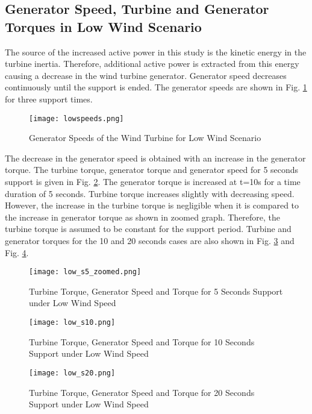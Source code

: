 \subsection{Generator Speed, Turbine and Generator Torques in Low Wind Scenario}
The source of the increased active power in this study is the kinetic energy in the turbine inertia. Therefore, additional active power is extracted from this energy causing a decrease in the wind turbine generator. Generator speed decreases continuously until the support is ended. The generator speeds are shown in Fig. \ref{low_speeds} for three support times.\par
\begin{figure}[h!]
	\centering
	\texttt{[image: lowspeeds.png]}
	\caption{Generator Speeds of the Wind Turbine for Low Wind Scenario}
	\label{low_speeds}
\end{figure}
The decrease in the generator speed is obtained with an increase in the generator torque. The turbine torque, generator torque and generator speed for 5 seconds support is given in Fig. \ref{low_torques}. The generator torque is increased at t=10s for a time duration of 5 seconds. Turbine torque increases slightly with decreasing speed. However, the increase in the turbine torque is negligible when it is compared to the increase in generator torque as shown in zoomed graph. Therefore, the turbine torque is assumed to be constant for the support period. Turbine and generator torques for the 10 and 20 seconds cases are also shown in Fig. \ref{low_torques2} and Fig. \ref{low_torques3}. 
\begin{figure}[h!]
	\centering
	\texttt{[image: low\_s5\_zoomed.png]}
	\caption{Turbine Torque, Generator Speed and Torque for 5 Seconds Support under Low Wind Speed}
	\label{low_torques}
\end{figure}

\begin{figure}[h!]
	\centering
	\texttt{[image: low\_s10.png]}
	\caption{Turbine Torque, Generator Speed and Torque for 10 Seconds Support under Low Wind Speed}
	\label{low_torques2}
\end{figure}

\begin{figure}[h!]
	\centering
	\texttt{[image: low\_s20.png]}
	\caption{Turbine Torque, Generator Speed and Torque for 20 Seconds Support under Low Wind Speed}
	\label{low_torques3}
\end{figure}
